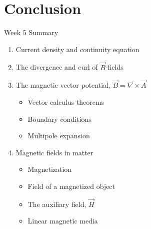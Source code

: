 \documentclass{beamer}
\begin{document}
\section{Conclusion}

\begin{frame}{Week 5 Summary}
\begin{enumerate}
\item Current density and continuity equation
\item The divergence and curl of $\vec{B}$-fields
\item The magnetic vector potential, $\vec{B} = \nabla \times \vec{A}$
\begin{itemize}
\item Vector calculus theorems
\item Boundary conditions
\item Multipole expansion
\end{itemize}
\item Magnetic fields in matter
\begin{itemize}
\item Magnetization
\item Field of a magnetized object
\item The auxiliary field, $\vec{H}$
\item Linear magnetic media
\end{itemize}
\end{enumerate}
\end{frame}
\end{document}
